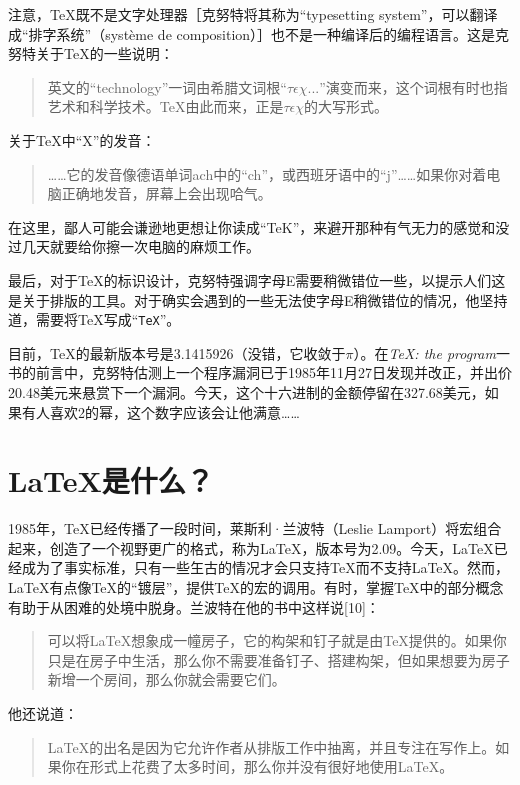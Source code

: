 注意，\TeX 既不是文字处理器［克努特将其称为“typesetting system”，可以翻译成“排字系统”（système de composition）］也不是一种编译后的编程语言。这是克努特关于\TeX 的一些说明：

\begin{quote}
    英文的“technology”一词由希腊文词根“$ \tau\epsilon\chi...$”演变而来，这个词根有时也指艺术和科学技术。\TeX 由此而来，正是$ \tau\epsilon\chi$的大写形式。
\end{quote}

关于\TeX 中“X”的发音：

\begin{quote}
    ……它的发音像德语单词ach中的“ch”，或西班牙语中的“j”……如果你对着电脑正确地发音，屏幕上会出现哈气。
\end{quote}

在这里，鄙人可能会谦逊地更想让你读成“TeK”，来避开那种有气无力的感觉和没过几天就要给你擦一次电脑的麻烦工作。

最后，对于\TeX 的标识设计，克努特强调字母E需要稍微错位一些，以提示人们这是关于排版的工具。对于确实会遇到的一些无法使字母E稍微错位的情况，他坚持道，需要将\TeX 写成“\texttt{TeX}”。

目前，\TeX 的最新版本号是3.1415926（没错，它收敛于$\pi$）。在\emph{\TeX : the program}一书的前言中，克努特估测上一个程序漏洞已于1985年11月27日发现并改正，并出价20.48美元来悬赏下一个漏洞。今天，这个十六进制的金额停留在327.68美元，如果有人喜欢2的幂，这个数字应该会让他满意……

\section*{\LaTeX 是什么？}

1985年，\TeX 已经传播了一段时间，莱斯利·兰波特（Leslie Lamport）将宏组合起来，创造了一个视野更广的格式，称为\LaTeX ，版本号为2.09。今天，\LaTeX 已经成为了事实标准，只有一些玍古的情况才会只支持\TeX 而不支持\LaTeX 。然而，\LaTeX 有点像\TeX 的“镀层”，提供\TeX 的宏的调用。有时，掌握\TeX 中的部分概念有助于从困难的处境中脱身。兰波特在他的书中这样说[10]：%

\begin{quote}
    可以将\LaTeX 想象成一幢房子，它的构架和钉子就是由\TeX 提供的。如果你只是在房子中生活，那么你不需要准备钉子、搭建构架，但如果想要为房子新增一个房间，那么你就会需要它们。
\end{quote}

他还说道：

\begin{quote}
    \LaTeX 的出名是因为它允许作者从排版工作中抽离，并且专注在写作上。如果你在形式上花费了太多时间，那么你并没有很好地使用\LaTeX 。
\end{quote}

